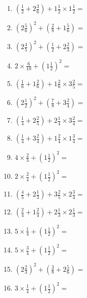 \documentclass[12pt]{article}
\begin{document}
\begin{enumerate}
\item \large $ (\frac{1}{2} + 2 \frac{3}{6}) + 1 \frac{1}{2} \times 1 \frac{1}{2} = $ \vspace{1.8cm}
\item \large $ (2 \frac{5}{6})^2 + (\frac{2}{8} + 1 \frac{5}{6}) = $ \vspace{1.8cm}
\item \large $ (2 \frac{4}{5})^2 + (\frac{1}{2} + 2 \frac{2}{3}) = $ \vspace{1.8cm}
\item \large $ 2 \times \frac{6}{10} + (1 \frac{1}{2})^2 = $ \vspace{1.8cm}
\item \large $ (\frac{1}{6} + 1 \frac{2}{6}) + 1 \frac{2}{6} \times 3 \frac{2}{5} = $ \vspace{1.8cm}
\item \large $ (2 \frac{1}{2})^2 + (\frac{7}{8} + 3 \frac{2}{4}) = $ \vspace{1.8cm}
\newpage
\item \large $ (\frac{1}{4} + 2 \frac{2}{5}) + 2 \frac{1}{4} \times 3 \frac{2}{4} = $ \vspace{1.8cm}
\item \large $ (\frac{1}{4} + 3 \frac{2}{4}) + 1 \frac{2}{4} \times 1 \frac{3}{4} = $ \vspace{1.8cm}
\item \large $ 4 \times \frac{2}{3} + (1 \frac{1}{2})^2 = $ \vspace{1.8cm}
\item \large $ 2 \times \frac{2}{4} + (1 \frac{1}{2})^2 = $ \vspace{1.8cm}
\item \large $ (\frac{4}{5} + 2 \frac{1}{3}) + 3 \frac{2}{5} \times 2 \frac{3}{4} = $ \vspace{1.8cm}
\item \large $ (\frac{2}{4} + 1 \frac{2}{4}) + 2 \frac{1}{3} \times 2 \frac{1}{3} = $ \vspace{1.8cm}
\item \large $ 5 \times \frac{1}{4} + (1 \frac{1}{2})^2 = $ \vspace{1.8cm}
\item \large $ 5 \times \frac{3}{4} + (1 \frac{1}{2})^2 = $ \vspace{1.8cm}
\item \large $ (2 \frac{2}{3})^2 + (\frac{3}{8} + 2 \frac{5}{6}) = $ \vspace{1.8cm}
\item \large $ 3 \times \frac{1}{4} + (1 \frac{1}{2})^2 = $ \vspace{1.8cm}

\end{enumerate}
\end{document}
